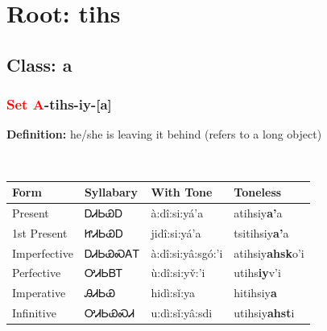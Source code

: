 \needspace{4in}
\section*{Root: tihs}
\nopagebreak
{}
\needspace{3in}
\subsection*{Class: a}
\nopagebreak
\needspace{2in}
\subsubsection*{\textcolor{Red}{Set A}{-}\textbf{tihs}{-}iy{-}[a]}
\nopagebreak
\textbf{Definition: } he/she is leaving it behind (refers to a long object)
\\[0.5em]
\begin{tabularx}{\textwidth}{l X X X}%
\toprule%
\textbf{Form}&\textbf{Syllabary}&\textbf{With Tone}&\textbf{Toneless}\\%
\midrule%
Present&ᎠᏗᏏᏯᎠ&à:dî:si:yá’a&atihsiy\textbf{a'}a\\%
1st Present&ᏥᏗᏏᏯᎠ&jidî:si:yá’a&tsitihsiy\textbf{a'}a\\%
Imperfective&ᎠᏗᏏᏯᏍᎪᎢ&à:dî:si:yâ:sgó:’i&atihsiy\textbf{ahsk}o'i\\%
Perfective&ᎤᏗᏏᏴᎢ&ù:dî:si:yv̌:’i&utihs\textbf{iy}v'i\\%
Imperative&ᎯᏗᏏᏯ&hidì:sǐ:ya&hitihsiy\textbf{a}\\%
Infinitive&ᎤᏗᏏᏯᏍᏗ&u:dì:sǐ:yâ:sdi&utihsiy\textbf{ahst}i\\%
\bottomrule%
\end{tabularx}
\\[1em]